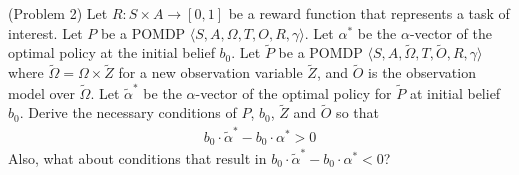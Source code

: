\documentclass{article}
\newcommand{\td}[1]{\tilde{#1}}
\begin{document}


\begin{definition}(Problem 2)
Let $R:S\times A\rightarrow [0,1]$ be a reward function that represents a
task of interest.
Let $P$ be a POMDP $\langle S, A, \Omega, T, O, R, \gamma  \rangle$. Let $\alpha^*$ be the $\alpha$-vector of the optimal policy at the initial belief $b_0$. Let $\td{P}$ be a POMDP $\langle S, A, \td{\Omega}, T, \td{O}, R, \gamma  \rangle$ where $\td{\Omega}=\Omega\times\td{Z}$ for a new observation variable $\td{Z}$, and $\td{O}$ is the observation model over $\td{\Omega}$. Let $\td{\alpha}^*$ be the $\alpha$-vector of the optimal policy for $\td{P}$ at initial belief $b_0$. Derive the necessary conditions of $P$, $b_0$, $\td{Z}$ and $\td{O}$ so that
\begin{align}
b_0\cdot \td{\alpha}^* - b_0\cdot \alpha^* > 0
\end{align}
Also, what about conditions that result in $b_0\cdot \td{\alpha}^* - b_0\cdot \alpha^* < 0$?
\end{definition}
\end{document}
